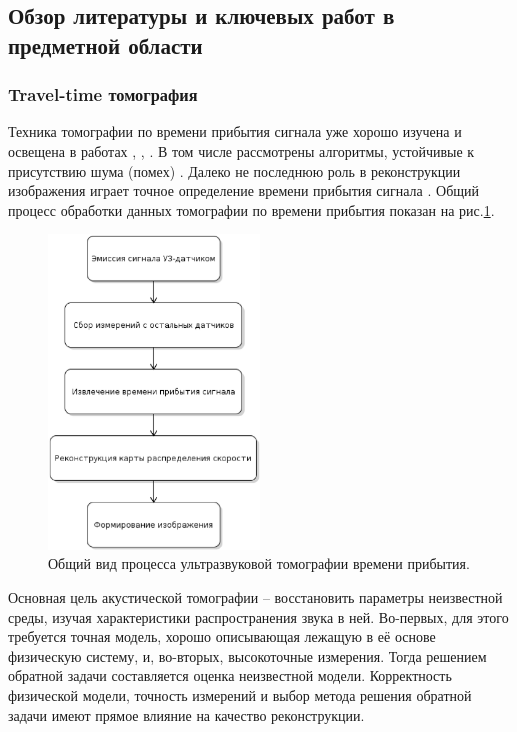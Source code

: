 \documentclass[14pt]{matmex-diploma-custom}
\begin{document}
\subsection{Обзор литературы и ключевых работ в предметной области}

\subsubsection{Travel-time томография} \label{sec:travel_times_descr}
Техника томографии по времени прибытия сигнала уже хорошо изучена и освещена в работах \cite{Kunyansky2012111}, \cite{quan2007sound}, \cite{hopp2014breast}. В том числе рассмотрены алгоритмы, устойчивые к присутствию шума (помех) \cite{hormati2010robust}. Далеко не последнюю роль в реконструкции изображения играет точное определение времени прибытия сигнала \cite{li2009improved}. Общий процесс обработки данных томографии по времени прибытия показан на рис.\ref{fig:us_process}.
\begin{figure}[h]
\centering
    \includegraphics[width=0.5\textwidth]{pics_eps/us_process.eps}
    \caption{\small Общий вид процесса ультразвуковой томографии времени прибытия.}
    \label{fig:us_process}
\end{figure}
Основная цель акустической томографии -- восстановить параметры неизвестной среды, изучая характеристики распространения звука в ней. Во-первых, для этого требуется точная модель, хорошо описывающая лежащую в её основе физическую систему, и, во-вторых, высокоточные измерения. Тогда решением обратной задачи составляется оценка неизвестной модели. Корректность физической модели, точность измерений и выбор метода решения обратной задачи имеют прямое влияние на качество реконструкции. \\
\end{document}
